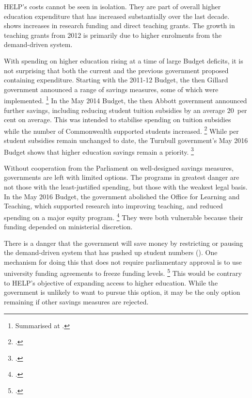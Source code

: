 \documentclass[embargoed]{grattan}
\begin{document}
\gls{HELP}'s costs cannot be seen in isolation.
They are part of overall higher education expenditure that has increased substantially over the last decade.
 shows increases in research funding and direct teaching grants.
The growth in teaching grants from 2012 is primarily due to higher enrolments from the demand-driven system.

With spending on higher education rising at a time of large Budget deficits, it is not surprising that both the current and the previous government proposed containing expenditure.
Starting with the 2011-12 Budget, the then Gillard government announced a range of savings measures, some of which were implemented.%
\footnote{Summarised at \textcite[][p. 12]{Warburton2016ResourcingAustraliastertiary}.} In the May 2014 Budget, the then Abbott government announced further savings, including reducing student tuition subsidies by an average 20~per cent on average.
This was intended to stabilise spending on tuition subsidies while the number of \gls{Commonwealth supported} students increased.%
\footcite[][67--69]{Education2014Portfoliobudgetstatements} 
While per student subsidies remain unchanged to date, the Turnbull government's May 2016 Budget shows that higher education savings remain a priority.%
\footcite{Education2016DrivingInnovationFairness}

Without cooperation from the Parliament on well-designed savings measures, governments are left with limited options.
The programs in greatest danger are not those with the least-justified spending, but those with the weakest legal basis.
In the May 2016 Budget, the government abolished the Office for Learning and Teaching, which supported research into improving teaching, and reduced spending on a major equity program.%
\footcite[][57]{Education2016Portfoliobudgetstatements} 
They were both vulnerable because their funding depended on ministerial discretion.

There is a danger that the government will save money by restricting or pausing the demand-driven system that has pushed up student numbers ().
One mechanism for doing this that does not require parliamentary approval is to use university funding agreements to freeze funding levels.%
\footcite[][Chapter~7]{Norton2013Keepcapsoff} 
This would be contrary to \gls{HELP}'s objective of expanding access to higher education.
While the government is unlikely to want to pursue this option, it may be the only option remaining if other savings measures are rejected.
\end{document}
